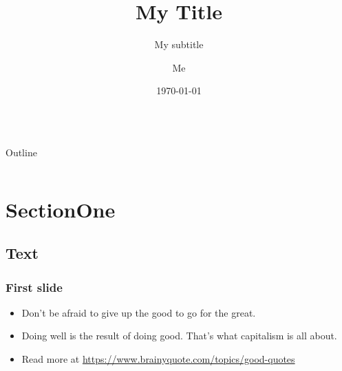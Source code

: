 \documentclass[aspectratio=169, serif ]{beamer}
\title{My Title}
\subtitle{My subtitle}
\author{Me}
\institute{\texorpdfstring{ Example College\newline Example University \newline \url{example@example.com}}{}}
\date{\today}
\begin{document}
\begingroup
{}
{
\begin{frame}
 \titlepage
\end{frame}
}
\endgroup

\begin{frame}
    \frametitle{}
    \begin{columns}
            \begin{flushright}
                \textcolor{CatalinaBlue}{\huge Outline}
            \end{flushright}
            
            \tableofcontents
    \end{columns}
\end{frame}


\section{SectionOne}
\subsection{Text}

\begin{frame}
\frametitle{First slide}
    \begin{itemize}
        \item Don't be afraid to give up the good to go for the great.
        \item Doing well is the result of doing good. That's what capitalism is all about.
        \item Read more at  \url{https://www.brainyquote.com/topics/good-quotes}  
    \end{itemize}
\end{frame}
\end{document}
